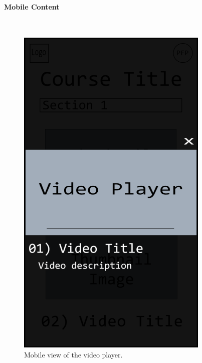 \documentclass{article}
\begin{document}
\paragraph{Mobile Content}\\
\begin{figure}[h!]
    \caption{Mobile view of the video player.}
    \includegraphics[width=\textwidth]{mobile_course_video}
\end{figure}
\end{document}

